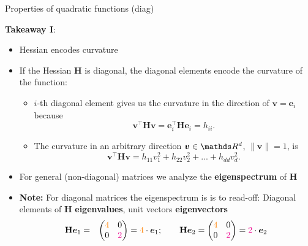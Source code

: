\documentclass[11pt,compress,t,notes=noshow, xcolor=table]{beamer}
\begin{document}
  \begin{frame}{Properties of quadratic functions (diag)}
  
  \textbf{Takeaway I}: 
  
  \begin{itemize}
    \item Hessian encodes curvature 
    \item If the Hessian $\mathbf{H}$ is diagonal, the diagonal elements encode the curvature of the function: 
  
    \begin{itemize}
      \item $i$-th diagonal element gives us the curvature in the direction of $\bm{v} = \bm{e}_i$ because 
      $$
      \bm{v}^\top \bm{H} \bm{v} = \bm{e}_i^\top \bm{H} \bm{e}_i = h_{ii}.
      $$
      \item The curvature in an arbitrary direction $\bm{v}
      \in \R^d$, $\|\bm{v}\| = 1$, is 
      $$
      \bm{v}^\top\mathbf{H}\bm{v} = h_{11} v_1^2 + h_{22}v_2^2 + ... + h_{dd}v_d^2. 
      $$
    \end{itemize}
  
    \item<2-> For general (non-diagonal) matrices we analyze the \textbf{eigenspectrum} of $\mathbf{H}$ 
    \vspace*{0.2cm}
    \item<2->[] \begin{footnotesize}
    \textbf{Note: } For diagonal matrices the eigenspectrum is is to read-off: Diagonal elements of $\mathbf{H}$ \textbf{eigenvalues}, unit vectors \textbf{eigenvectors}
    \begin{eqnarray*}
      \mathbf{H} \bm{e}_1 &=& \begin{pmatrix} \textcolor{orange}{4} & 0 \\ 0 & \textcolor{magenta}{2} \end{pmatrix} = \textcolor{orange}{4} \cdot \bm{e}_1; \qquad \mathbf{H} \bm{e}_2 = \begin{pmatrix} \textcolor{orange}{4} & 0 \\ 0 & \textcolor{magenta}{2} \end{pmatrix} = \textcolor{magenta}{2} \cdot \bm{e}_2 \\		
    \end{eqnarray*}	
    \end{footnotesize}
  
  \end{itemize}
  
  
  \end{frame}
  
\end{document}
